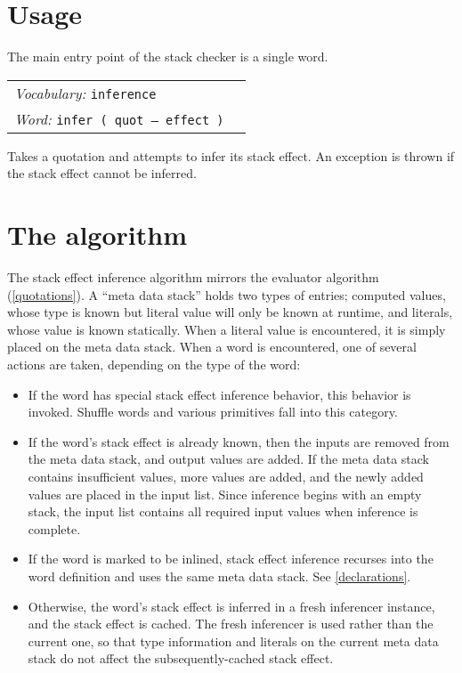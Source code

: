 \documentclass{book}
\newcommand{\vocabulary}[1]{\emph{Vocabulary:} \texttt{#1}&\\}
\newcommand{\ordinaryword}[2]{\index{\texttt{#1}}\emph{Word:} \texttt{#2}&\\}
\newcommand{\wordtable}[1]{


\begin{tabularx}{12cm}{lX}
\hline
#1
\hline
\end{tabularx}

}
\begin{document}
\section{Usage}

The main entry point of the stack checker is a single word.

\wordtable{
\vocabulary{inference}
\ordinaryword{infer}{infer ( quot -- effect )}
}

Takes a quotation and attempts to infer its stack effect. An exception is thrown if the stack effect cannot be inferred.

\section{The algorithm}

The stack effect inference algorithm mirrors the evaluator algorithm (\ref{quotations}). A ``meta data stack'' holds two types of entries; computed values, whose type is known but literal value will only be known at runtime, and literals, whose value is known statically. When a literal value is encountered, it is simply placed on the meta data stack. When a word is encountered, one of several actions are taken, depending on the type of the word:

\begin{itemize}
\item If the word has special stack effect inference behavior, this behavior is invoked. Shuffle words and various primitives fall into this category.
\item If the word's stack effect is already known, then the inputs are removed from the meta data stack, and output values are added. If the meta data stack contains insufficient values, more values are added, and the newly added values are placed in the input list. Since inference begins with an empty stack, the input list contains all required input values when inference is complete.
\item If the word is marked to be inlined, stack effect inference recurses into the word definition and uses the same meta data stack. See \ref{declarations}.
\item Otherwise, the word's stack effect is inferred in a fresh inferencer instance, and the stack effect is cached. The fresh inferencer is used rather than the current one, so that type information and literals on the current meta data stack do not affect the subsequently-cached stack effect.
\end{itemize}
\end{document}
